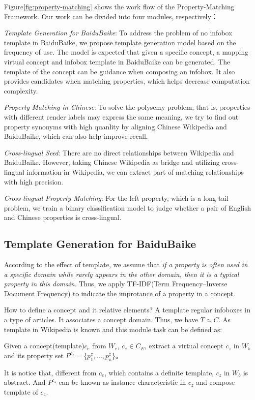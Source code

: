 \documentclass[runningheads,a4paper]{llncs}
\begin{document}
Figure\ref{fig:property-matching} shows the work flow of the Property-Matching Framework. Our work can be divided into four modules, respectively：

\textit{Template Generation for BaiduBaike}:
To address the problem of no infobox template in BaiduBaike, we propose template generation model based on the frequency of use. The model is expected that given a specific concept, a mapping virtual concept and infobox template in BaiduBaike can be generated. The template of the concept can be guidance when composing an infobox. It also provides candidates when matching properties, which helps decrease computation complexity.

\textit{Property Matching in Chinese}:
To solve the polysemy problem, that is, properties with different render labels may express the same meaning, we try to find out property synonyms with high quanlity by aligning Chinese Wikipedia and BaiduBaike, which can also help improve recall.

\textit{Cross-lingual Seed}:
There are no direct relationships between Wikipedia and BaiduBaike. However, taking Chinese Wikipedia as bridge and utilizing cross-lingual information in Wikipedia, we can extract part of matching relationships with high precision.

\textit{Cross-lingual Property Matching}:
For the left property, which is a long-tail problem, we train a binary classification model to judge whether a pair of English and Chinese properties is cross-lingual.

\subsection{Template Generation for BaiduBaike}
According to the effect of template, we assume that \emph{if a property is often used in a specific domain while rarely appears in the other domain, then it is a typical property in this domain}. Thus, we apply TF-IDF(Term Frequency–Inverse Document Frequency) to indicate the improtance of a property in a concept.

How to define a concept and it relative elements? A template regular infoboxes in a type of articles. It associates a concept domain. Thus, we have $T \approx C$. As template in Wikipedia is known and this module task can be defined as:
\begin{definition}
Given a concept(template)$c_e$ from $W_e$, $c_e \in C_E$, extract a virtual concept $c_z$ in $W_b$ and its property set $P^{c_z}=\{p_1^z,...,p_n^z\}$。
\end{definition}
It is notice that, different from $c_e$, which contains a definite template, $c_z$ in $W_b$ is abstract. And $P^{c_z}$ can be known as instance characteristic in $c_z$ and compose template of $c_z$.
\end{document}

